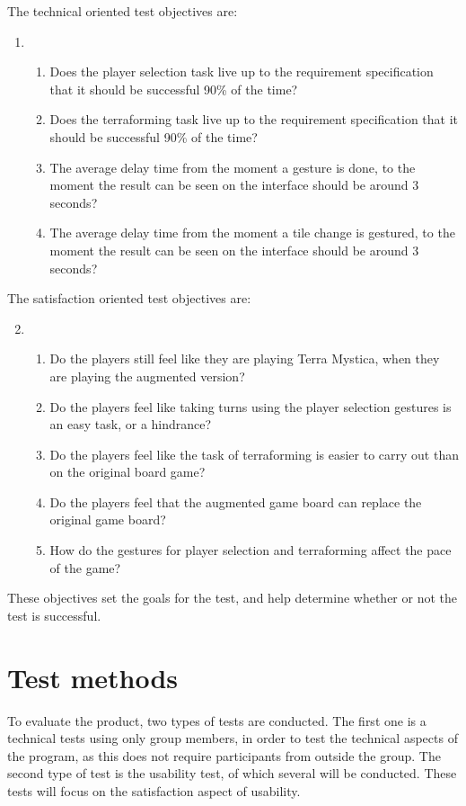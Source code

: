 The technical oriented test objectives are:
\begin{enumerate}
\setcounter{enumi}{0}
\item \begin{enumerate}
\item Does the player selection task live up to the requirement specification that it should be successful 90\% of the time? \label{req:1A}
\item Does the terraforming task live up to the requirement specification that it should be successful 90\% of the time? \label{req:1B}
\item The average delay time from the moment a gesture is done, to the moment the result can be seen on the interface should be around 3 seconds? \label{req:1C}
\item The average delay time from the moment a tile change is gestured, to the moment the result can be seen on the interface should be around 3 seconds? \label{req:1D}
\end{enumerate}
\end{enumerate}
The satisfaction oriented test objectives are:
\begin{enumerate}
\setcounter{enumi}{1}
\item \begin{enumerate}
\item Do the players still feel like they are playing Terra Mystica, when they are playing the augmented version? \label{req:2A}
\item Do the players feel like taking turns using the player selection gestures is an easy task, or a hindrance? \label{req:2B}
\item Do the players feel like the task of terraforming is easier to carry out than on the original board game? \label{req:2C}
\item Do the players feel that the augmented game board can replace the original game board? \label{req:2D}
\item How do the gestures for player selection and terraforming affect the pace of the game? \label{req:2E}
\end{enumerate}
\end{enumerate}

These objectives set the goals for the test, and help determine whether or not the test is successful. 

\section{Test methods}
To evaluate the product, two types  of tests are conducted. The first one is a technical tests using only group members, in order to test the technical aspects of the program, as this does not require participants from outside the group. The second type of test is the usability test, of which several will be conducted. These tests will focus on the satisfaction aspect of usability.

